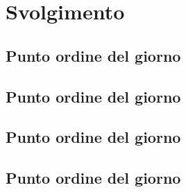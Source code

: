 \section*{Svolgimento}
\subsection*{Punto ordine del giorno}
\subsection*{Punto ordine del giorno}
\subsection*{Punto ordine del giorno}
\subsection*{Punto ordine del giorno}
